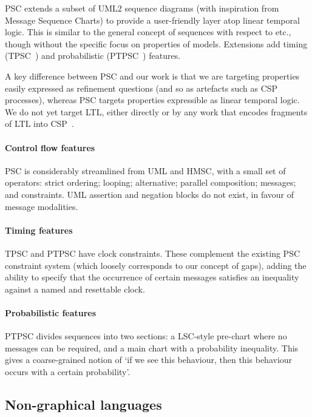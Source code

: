 PSC extends a subset of UML2 sequence diagrams (with inspiration from
Message Sequence Charts) to provide a
user-friendly layer atop linear temporal logic.  This is
similar to the general concept of \langname{} sequences with respect to \tockcsp{}
etc., though without the
specific focus on properties of \robochart{} models.
Extensions add timing (TPSC~\cite{tpsc}) and
probabilistic (PTPSC~\cite{ptpsc}) features.

A key difference between PSC and our work is that we are
targeting  properties easily expressed as refinement questions
(and so as artefacts such as CSP processes), whereas PSC targets properties
expressible as linear temporal logic.  We do not yet target LTL,
either directly or by any work that encodes fragments of LTL into
CSP~\cite{fdrspin,Lowe08-CommunicatingProcessSpecification}.

\paragraph{Control flow features}
PSC is considerably streamlined from UML and HMSC, with a small set of operators: strict
ordering; looping; alternative; parallel composition; messages; and constraints.
UML assertion and negation blocks do not exist, in favour of message modalities.

\paragraph{Timing features}
TPSC and PTPSC have clock constraints.  These complement the existing PSC constraint system
(which loosely corresponds to our concept of gaps), adding the ability to
specify that the occurrence of certain messages satisfies an inequality against
a named and resettable clock.

\paragraph{Probabilistic features}
PTPSC divides sequences into two sections: a LSC-style pre-chart where no messages can be required,
and a main chart with a probability inequality.  This gives a coarse-grained notion of `if we see
this behaviour, then this behaviour occurs with a certain probability'.

\subsection{Non-graphical languages}

